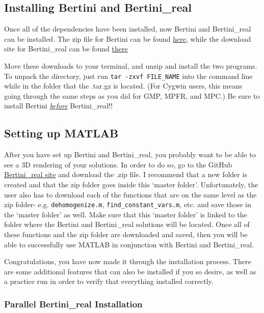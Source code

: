\clearpage
	\subsection{Installing Bertini and Bertini\_real}

Once all of the dependencies have been installed, now Bertini and Bertini\_real can be installed. The zip file for Bertini can be found
\href{http://bertini.nd.edu/download.html}{here}, while the download site for Bertini\_real can be found
\href{http://www.bertinireal.com/download.html}{there}

Move these downloads to your terminal, and unzip and install the two programs. To unpack the directory, just run \texttt{tar -zxvf FILE\_NAME} into the command line while in the folder that the .tar.gz is located. (For Cygwin users, this means going through the same steps as you did for GMP, MPFR, and MPC.) Be sure to install Bertini \textit{\underline{before}} Bertini\_real!!


	\subsection{Setting up MATLAB}
After you have set up Bertini and Bertini\_real, you probably want to be able to see a 3D rendering of your solutions. In order to do so, go to the GitHub  \href{https://github.com/ofloveandhate/bertini_real/tree/master/matlab_codes}{Bertini\_real site} and download the .zip file. I recommend that a new folder is created and that the zip folder goes inside this `master folder'. Unfortunately, the user also has to download each of the functions that are on the same level as the zip folder- e.g. \texttt{dehomogenize.m}, \texttt{find\_constant\_vars.m}, etc. and save those in the `master folder' as well. Make sure that this `master folder' is linked to the folder where the Bertini and Bertini\_real solutions will be located. Once all of these functions and the zip folder are downloaded and saved, then you will be able to successfully use MATLAB in conjunction with Bertini and Bertini\_real. 

\begin{centering}
Congratulations, you have now made it through the installation process. There are some additional features that can also be installed if you so desire, as well as a practice run in order to verify that everything installed correctly.
\end{centering}



		\subsubsection{Parallel Bertini\_real Installation}

